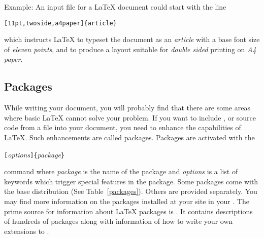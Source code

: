 Example: An input file for a \LaTeX{} document could start with the
line
\begin{code}
\verb|[11pt,twoside,a4paper]{article}|
\end{code}
which instructs \LaTeX{} to typeset the document as an \emph{article}
with a base font size of \emph{eleven points}, and to produce a
layout suitable for \emph{double sided} printing on \emph{A4 paper}.
\pagebreak[2]
\subsection{Packages}
 While writing your document, you will probably find
that there are some areas where basic \LaTeX{} cannot solve your
problem. If you want to include ,  or
source code from a file into your document, you need to enhance the
capabilities of \LaTeX.  Such enhancements are called packages.
Packages are activated with the
\begin{command}
\verb|[|\emph{options}\verb|]{|\emph{package}\verb|}|
\end{command}
\noindent command where \emph{package} is the name of the package and
\emph{options} is a list of keywords which trigger special features in
the package. Some packages come with the \LaTeXe{} base distribution
(See Table~\ref{packages}). Others are provided separately. You may
find more information on the packages installed at your site in your
\guide. The prime source for information about \LaTeX{} packages is \companion.
It contains descriptions of hundreds of packages along with
information of how to write your own extensions to \LaTeXe.

